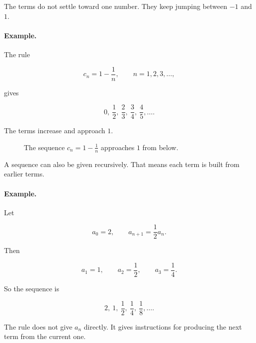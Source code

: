 The terms do not settle toward one number.  They keep jumping between \(-1\) and
\(1\).

\paragraph{Example.}
The rule

\[
c_n=1-\frac1n,
\qquad n=1,2,3,\ldots,
\]

gives

\[
0,\ \frac12,\ \frac23,\ \frac34,\ \frac45,\ldots.
\]

The terms increase and approach \(1\).

\begin{figure}[h]
\centering
{}
\caption{The sequence \(c_n=1-\frac1n\) approaches \(1\) from below.}
\label{fig:sequence-points-approach-one}
\end{figure}

A sequence can also be given recursively.  That means each term is built from earlier
terms.

\paragraph{Example.}
Let

\[
a_0=2,
\qquad
a_{n+1}=\frac12a_n.
\]

Then

\[
a_1=1,\qquad
a_2=\frac12,\qquad
a_3=\frac14.
\]

So the sequence is

\[
2,\ 1,\ \frac12,\ \frac14,\ \frac18,\ldots.
\]

The rule does not give \(a_n\) directly.  It gives instructions for producing the next
term from the current one.

